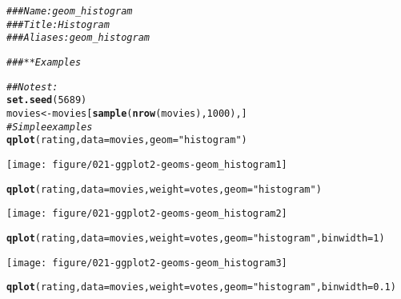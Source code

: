\documentclass[a4paper,titlepage]{tufte-handout}\usepackage[]{graphicx}\usepackage[]{color}
\makeatletter
\def\maxwidth{ %
  \ifdim\Gin@nat@width>\linewidth
    \linewidth
  \else
    \Gin@nat@width
  \fi
}
\newcommand{\hlnum}[1]{\textcolor[rgb]{0.686,0.059,0.569}{#1}}%
\newcommand{\hlstr}[1]{\textcolor[rgb]{0.192,0.494,0.8}{#1}}%
\newcommand{\hlcom}[1]{\textcolor[rgb]{0.678,0.584,0.686}{\textit{#1}}}%
\newcommand{\hlstd}[1]{\textcolor[rgb]{0.345,0.345,0.345}{#1}}%
\newcommand{\hlkwb}[1]{\textcolor[rgb]{0.69,0.353,0.396}{#1}}%
\newcommand{\hlkwc}[1]{\textcolor[rgb]{0.333,0.667,0.333}{#1}}%
\newcommand{\hlkwd}[1]{\textcolor[rgb]{0.737,0.353,0.396}{\textbf{#1}}}%
\newenvironment{kframe}{%
 \def\at@end@of@kframe{}%
 \ifinner\ifhmode%
  \def\at@end@of@kframe{\end{minipage}}%
  \begin{minipage}{\columnwidth}%
 \fi\fi%
 \def\FrameCommand##1{\hskip\@totalleftmargin \hskip-\fboxsep
 \colorbox{shadecolor}{##1}\hskip-\fboxsep
     \hskip-\linewidth \hskip-\@totalleftmargin \hskip\columnwidth}%
 \MakeFramed {\advance\hsize-\width
   \@totalleftmargin\z@ \linewidth\hsize
   \@setminipage}}%
 {\par\unskip\endMakeFramed%
 \at@end@of@kframe}
\newenvironment{knitrout}{}{} %
\makeatother
\begin{document}
\begin{knitrout}
\color{fgcolor}\begin{kframe}
\begin{alltt}
\hlcom{### Name: geom_histogram}
\hlcom{### Title: Histogram}
\hlcom{### Aliases: geom_histogram}

\hlcom{### ** Examples}

\hlcom{## No test: }
\hlkwd{set.seed}\hlstd{(}\hlnum{5689}\hlstd{)}
\hlstd{movies} \hlkwb{<-} \hlstd{movies[}\hlkwd{sample}\hlstd{(}\hlkwd{nrow}\hlstd{(movies),} \hlnum{1000}\hlstd{), ]}
\hlcom{# Simple examples}
\hlkwd{qplot}\hlstd{(rating,} \hlkwc{data}\hlstd{=movies,} \hlkwc{geom}\hlstd{=}\hlstr{"histogram"}\hlstd{)}
\end{alltt}


{\ttfamily\noindent\itshape\color{messagecolor}{\#\# stat\_bin: binwidth defaulted to range/30. Use 'binwidth = x' to adjust this.}}

{\ttfamily\noindent\color{warningcolor}{\#\# Warning: position\_stack requires constant width: output may be incorrect}}\end{kframe}
\texttt{[image: figure/021-ggplot2-geoms-geom\_histogram1]} 
\begin{kframe}\begin{alltt}
\hlkwd{qplot}\hlstd{(rating,} \hlkwc{data}\hlstd{=movies,} \hlkwc{weight}\hlstd{=votes,} \hlkwc{geom}\hlstd{=}\hlstr{"histogram"}\hlstd{)}
\end{alltt}


{\ttfamily\noindent\itshape\color{messagecolor}{\#\# stat\_bin: binwidth defaulted to range/30. Use 'binwidth = x' to adjust this.}}

{\ttfamily\noindent\color{warningcolor}{\#\# Warning: position\_stack requires constant width: output may be incorrect}}\end{kframe}
\texttt{[image: figure/021-ggplot2-geoms-geom\_histogram2]} 
\begin{kframe}\begin{alltt}
\hlkwd{qplot}\hlstd{(rating,} \hlkwc{data}\hlstd{=movies,} \hlkwc{weight}\hlstd{=votes,} \hlkwc{geom}\hlstd{=}\hlstr{"histogram"}\hlstd{,} \hlkwc{binwidth}\hlstd{=}\hlnum{1}\hlstd{)}
\end{alltt}
\end{kframe}
\texttt{[image: figure/021-ggplot2-geoms-geom\_histogram3]} 
\begin{kframe}\begin{alltt}
\hlkwd{qplot}\hlstd{(rating,} \hlkwc{data}\hlstd{=movies,} \hlkwc{weight}\hlstd{=votes,} \hlkwc{geom}\hlstd{=}\hlstr{"histogram"}\hlstd{,} \hlkwc{binwidth}\hlstd{=}\hlnum{0.1}\hlstd{)}
\end{alltt}



\end{kframe}
\end{knitrout}
\end{document}
